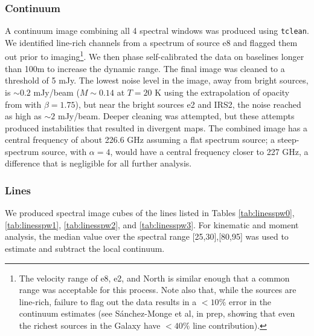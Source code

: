 \documentclass{emulateapj}
\begin{document}
\subsubsection{Continuum}
A continuum image combining all 4 spectral windows was produced using
\texttt{tclean}.  We identified line-rich channels from a spectrum of source e8
and flagged them out prior to imaging\footnote{The velocity
range of e8, e2, and North is similar enough that a common range was acceptable
for this process.  Note also that, while the sources are line-rich,
failure to flag out the data results in a $<10\%$ error in the continuum estimates
(see S{\'a}nchez-Monge et al, in prep, showing that even the richest
sources in the Galaxy have $<40\%$ line contribution).}.  We then phase
self-calibrated the data on baselines longer than 100m to increase the dynamic
range.  The final image
was cleaned to a threshold of 5 mJy.  The lowest noise
level in the image, away from bright sources, is $\sim0.2$ mJy/beam
($M\sim0.14$ \msun at $T=20$ K using the extrapolation of
\citet{Ossenkopf1994a} opacity from \citet{Aguirre2011a} with $\beta=1.75$),
but near the bright sources e2 and IRS2, the noise reached as high as $\sim2$
mJy/beam.  Deeper cleaning was attempted, but these attempts produced
instabilities that resulted in divergent maps.  The combined image has a central
frequency of about 226.6 GHz assuming a flat spectrum source; a steep-spectrum
source, with $\alpha=4$, would have a central frequency closer to 227 GHz, a
difference that is negligible for all further analysis.


\subsubsection{Lines}
\label{sec:obslines}
We produced spectral image cubes of the lines listed in Tables
\ref{tab:linesspw0}, \ref{tab:linesspw1}, \ref{tab:linesspw2}, and
\ref{tab:linesspw3}.  For kinematic and moment analysis, the median value over
the spectral range [25,30],[80,95] \kms was used to estimate and subtract the
local continuum. 
\end{document}
